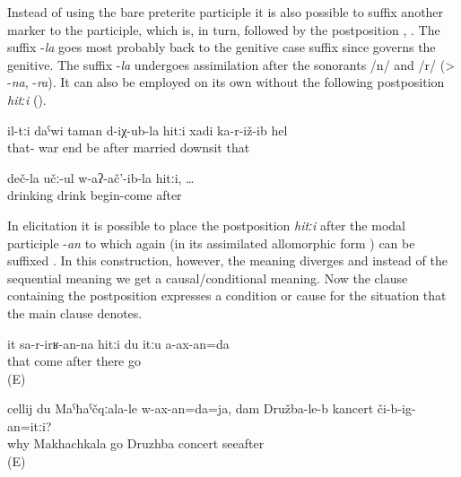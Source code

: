 Instead of using the bare preterite participle it is also possible to suffix another marker  to the participle, which is, in turn, followed by the postposition , . The suffix -\textit{la} goes most probably back to the genitive case suffix since  governs the genitive. The suffix -\textit{la} undergoes assimilation after the sonorants /n/ and /r/ (> -\textit{na}, -\textit{ra}). It can also be employed on its own without the following postposition \textit{hitːi} ().
%
\begin{exe}
	\ex	\label{ex:After the times of the war finished he married her}
	\gll	il-tːi	daˁwi	taman	d-iχ-ub-la	hitːi	xadi	ka-r-iž-ib	hel\\
		that-	war	end	be	after	married	downsit	that\\
	\glt	{}

	\ex	\label{ex:after he started drinking}
	\gll	deč-la	učː-ul	w-aʔ-ač'-ib-la	hitːi, \ldots\\
		drinking	drink	begin-come	after\\
	\glt	{}
\end{exe}

In elicitation it is possible to place the postposition \textit{hitːi} after the modal participle -\textit{an} to which again  (in its assimilated allomorphic form ) can be suffixed . In this construction, however, the meaning diverges and instead of the sequential meaning we get a causal\slash conditional meaning. Now the clause containing the postposition expresses a condition or cause for the situation that the main clause denotes.
%
\begin{exe}
	\ex	\label{ex:‎‎‎If / because she comes, I will not go there.}
	\gll	it	sa-r-irʁ-an-na	hitːi	du	itːu	a-ax-an=da\\
		that	come	after		there	go\\
	\glt	{} (E)

	\ex	\label{ex:Why should I go to Makhachkala, if / since I can will see the concert in Druzhba?}
	\gll	cellij	du	Maˁħaˁčqːala-le	w-ax-an=da=ja,	dam		Družba-le-b		kancert	či-b-ig-an=itːi?\\
		why		Makhachkala	go		Druzhba	concert	seeafter\\
	\glt	{} (E)
\end{exe}


